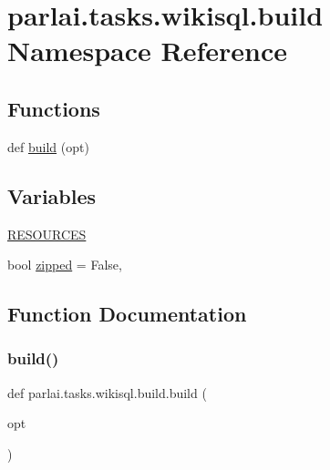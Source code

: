 \hypertarget{namespaceparlai_1_1tasks_1_1wikisql_1_1build}{}\section{parlai.\+tasks.\+wikisql.\+build Namespace Reference}
\label{namespaceparlai_1_1tasks_1_1wikisql_1_1build}
\subsection*{Functions}
\begin{DoxyCompactItemize}
\item 
def \hyperlink{namespaceparlai_1_1tasks_1_1wikisql_1_1build_a8b1665667190720ed464d8a0fcf056ba}{build} (opt)
\end{DoxyCompactItemize}
\subsection*{Variables}
\begin{DoxyCompactItemize}
\item 
\hyperlink{namespaceparlai_1_1tasks_1_1wikisql_1_1build_a6f28762458bfec32a46855606ded0884}{R\+E\+S\+O\+U\+R\+C\+ES}
\item 
bool \hyperlink{namespaceparlai_1_1tasks_1_1wikisql_1_1build_a24348716135950e8cff60a67869738bc}{zipped} = False,
\end{DoxyCompactItemize}


\subsection{Function Documentation}
\mbox{\label{namespaceparlai_1_1tasks_1_1wikisql_1_1build_a8b1665667190720ed464d8a0fcf056ba}} 
\subsubsection{\texorpdfstring{build()}{build()}}
{\footnotesize\ttfamily def parlai.\+tasks.\+wikisql.\+build.\+build (\begin{DoxyParamCaption}\item[{}]{opt }\end{DoxyParamCaption})}



